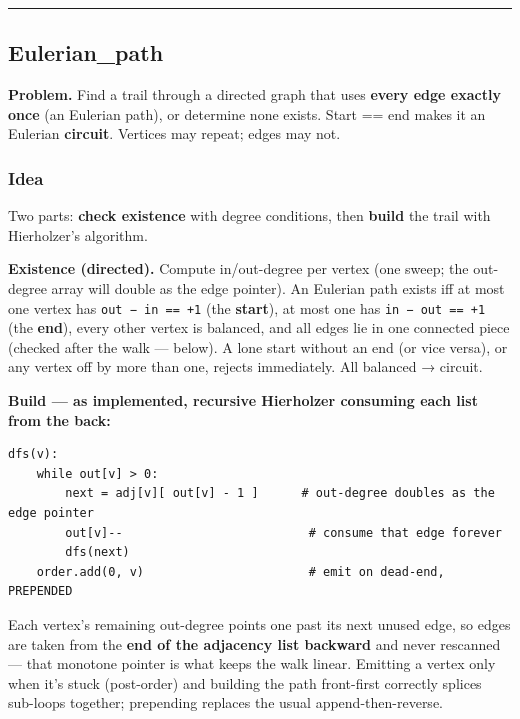 \documentclass[
  10pt,
  letterpaper,
  onecolumn]{article}
\begin{document}
\begin{center}\rule{0.5\linewidth}{0.5pt}\end{center}

\hypertarget{eulerian_path}{%
\subsection{Eulerian\_path}\label{eulerian_path}}

\textbf{Problem.} Find a trail through a directed graph that uses
\textbf{every edge exactly once} (an Eulerian path), or determine none
exists. Start == end makes it an Eulerian \textbf{circuit}. Vertices may
repeat; edges may not.

\hypertarget{idea-22}{%
\subsubsection{Idea}\label{idea-22}}

Two parts: \textbf{check existence} with degree conditions, then
\textbf{build} the trail with Hierholzer's algorithm.

\textbf{Existence (directed).} Compute in/out-degree per vertex (one
sweep; the out-degree array will double as the edge pointer). An
Eulerian path exists iff at most one vertex has
\texttt{out\ −\ in\ ==\ +1} (the \textbf{start}), at most one has
\texttt{in\ −\ out\ ==\ +1} (the \textbf{end}), every other vertex is
balanced, and all edges lie in one connected piece (checked after the
walk --- below). A lone start without an end (or vice versa), or any
vertex off by more than one, rejects immediately. All balanced →
circuit.

\textbf{Build --- as implemented, recursive Hierholzer consuming each
list from the back:}

\begin{verbatim}
dfs(v):
    while out[v] > 0:
        next = adj[v][ out[v] - 1 ]      # out-degree doubles as the edge pointer
        out[v]--                          # consume that edge forever
        dfs(next)
    order.add(0, v)                       # emit on dead-end, PREPENDED
\end{verbatim}

Each vertex's remaining out-degree points one past its next unused edge,
so edges are taken from the \textbf{end of the adjacency list backward}
and never rescanned --- that monotone pointer is what keeps the walk
linear. Emitting a vertex only when it's stuck (post-order) and building
the path front-first correctly splices sub-loops together; prepending
replaces the usual append-then-reverse.
\end{document}
